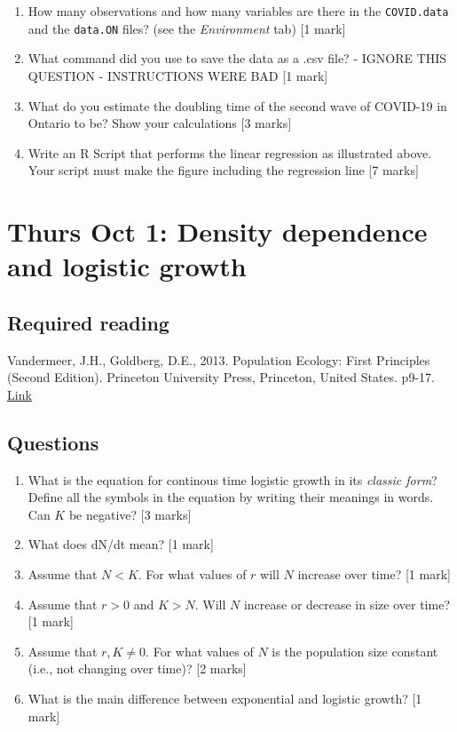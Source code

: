 \documentclass[]{book}
\begin{document}
\begin{enumerate}
\def\labelenumi{\arabic{enumi}.}
\item
  How many observations and how many variables are there in the
  \texttt{COVID.data} and the \texttt{data.ON} files? (see the
  \emph{Environment} tab) {[}1 mark{]}
\item
  What command did you use to save the data as a .csv file? - IGNORE
  THIS QUESTION - INSTRUCTIONS WERE BAD {[}1 mark{]}
\item
  What do you estimate the doubling time of the second wave of COVID-19
  in Ontario to be? Show your calculations {[}3 marks{]}
\item
  Write an R Script that performs the linear regression as illustrated
  above. Your script must make the figure including the regression line
  {[}7 marks{]}
\end{enumerate}

\chapter{Thurs Oct 1: Density dependence and logistic
growth}\label{thurs-oct-1-density-dependence-and-logistic-growth}

\section{Required reading}\label{required-reading-3}

Vandermeer, J.H., Goldberg, D.E., 2013. Population Ecology: First
Principles (Second Edition). Princeton University Press, Princeton,
United States. p9-17.
\href{https://ebookcentral-proquest-com.qe2a-proxy.mun.ca/lib/mun/detail.action?docID=1205619}{Link}

\section{Questions}\label{questions-8}

\begin{enumerate}
\def\labelenumi{\arabic{enumi}.}
\item
  What is the equation for continous time logistic growth in its
  \emph{classic form}? Define all the symbols in the equation by writing
  their meanings in words. Can \(K\) be negative? {[}3 marks{]}
\item
  What does dN/dt mean? {[}1 mark{]}
\item
  Assume that \(N < K\). For what values of \(r\) will \(N\) increase
  over time? {[}1 mark{]}
\item
  Assume that \(r > 0\) and \(K > N\). Will \(N\) increase or decrease
  in size over time? {[}1 mark{]}
\item
  Assume that \(r,K \neq 0\). For what values of \(N\) is the population
  size constant (i.e., not changing over time)? {[}2 marks{]}
\item
  What is the main difference between exponential and logistic growth?
  {[}1 mark{]}
\end{enumerate}
\end{document}
